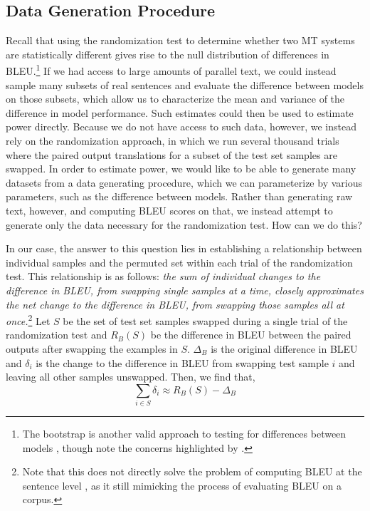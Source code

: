 \documentclass[11pt,a4paper]{article}
\begin{document}
\subsection{Data Generation Procedure}
\label{app:mt_datagen}
Recall that using the randomization test to determine whether two MT systems are statistically different gives rise to the null distribution of differences in BLEU.\footnote{The bootstrap is another valid approach to testing for differences between models \citep{koehn.2004,graham.2014,dror.2018}, though note the concerns highlighted by \citet{riezler.2005}.}
If we had access to large amounts of parallel text, we could instead sample many subsets of real sentences and evaluate the difference between models on those subsets, which allow us to characterize the mean and variance of the difference in model performance. Such estimates could then be used to estimate power directly.
Because we do not have access to such data, however, we instead rely on the randomization approach, 
in which we run several thousand trials where the paired output translations for a subset of the test set samples are swapped.
In order to estimate power, we would like to be able to generate many datasets from a data generating procedure, which we can parameterize by various parameters, such as the difference between models.
Rather than generating raw text, however, and computing BLEU scores on that, we instead attempt to generate only the data necessary for the randomization test.
How can we do this?

In our case, the answer to this question lies in establishing a relationship between individual samples and the permuted set within each trial of the randomization test.
This relationship is as follows: \emph{the sum of individual changes to the difference in BLEU, from swapping single samples at a time, closely approximates the net change to the difference in BLEU, from swapping those samples all at once.}\footnote{Note that this does not directly solve the problem of computing BLEU at the sentence level \citep{chen.2014}, as it still mimicking the process of evaluating BLEU on a corpus.}
Let $S$ be the set of test set samples swapped during a single trial of the randomization test and $R_B(S)$ be the difference in BLEU between the paired outputs after swapping the examples in $S$.
$\Delta_B$ is the original difference in BLEU and $\delta_i$ is the change to the difference in BLEU from swapping test sample $i$ and leaving all other samples unswapped.
Then, we find that,
\begin{equation*}
    \sum_{i \in S}{\delta_i} \approx R_B(S) - \Delta_B
\end{equation*}
\end{document}
